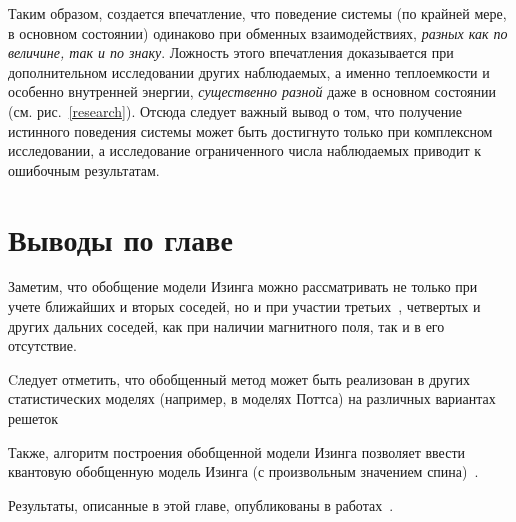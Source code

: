 Таким образом, создается впечатление, что поведение системы (по крайней мере, в основном состоянии) одинаково при обменных взаимодействиях, \emph{разных как по величине, так и по знаку}. Ложность этого впечатления доказывается при дополнительном исследовании других наблюдаемых, а именно теплоемкости и особенно внутренней энергии, \emph{существенно разной} даже в основном состоянии (см. рис.~\ref{research}). Отсюда следует важный вывод о том, что получение истинного поведения системы может быть достигнуто только при комплексном исследовании, а исследование ограниченного числа наблюдаемых приводит к ошибочным результатам.

\section{Выводы по главе}

Заметим, что обобщение модели Изинга можно рассматривать не только при учете ближайших и вторых соседей, но и при участии третьих~\cite{zarubin2020}, четвертых и других дальних соседей, как при наличии магнитного поля, так и в его отсутствие.

Cледует отметить, что обобщенный метод может быть реализован в других статистических моделях (например, в моделях Поттса) на различных вариантах решеток~\cite{proshkinThesis, kassan-ogly2000_1, kassan-ogly2000_2, proshkin2015, kassan-ogly2015}

Также, алгоритм построения обобщенной модели Изинга позволяет ввести квантовую обобщенную модель Изинга (с произвольным значением спина)~\cite{proshkin2016, proshkin2018}.

Результаты, описанные в этой главе, опубликованы в работах~\cite{confbib1, scbib1, confbib2, confbib3, confbib4, confbib5, vakbib1, vakbib2, vakbib3, confbib6, confbib7, confbib8, scbib2}.


\FloatBarrier
